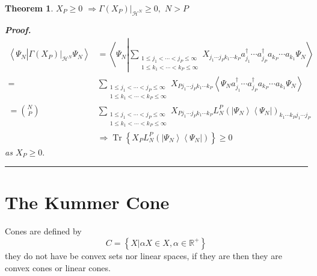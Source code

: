 \documentclass[aps,preprint]{revtex4}%
\newtheorem{theorem}{Theorem}
\newenvironment{proof}[1][Proof]{\noindent\textbf{#1.} }{\ \rule{0.5em}{0.5em}}
\begin{document}
\begin{theorem}
$X_{P}\geq0$ $\Rightarrow\left.  \Gamma\left(  X_{P}\right)  \right\vert
_{\mathcal{H}^{N}}\geq0,$ $N>P$

\begin{proof}%
\begin{align}
\left\langle \Psi_{N}\left\vert \left.  \Gamma\left(  X_{P}\right)
\right\vert _{\mathcal{H}^{N}}\right.  \Psi_{N}\right\rangle  &  =\left\langle
\Psi_{N}\left\vert \sum_{\substack{1\leq j_{1}<\cdots<j_{P}\leq\infty\\1\leq
k_{1}<\cdots<k_{P}\leq\infty}}X_{j_{1}\cdots j_{P}k_{1}\cdots k_{P}}a_{j_{1}%
}^{\dagger}\cdots a_{j_{P}}^{\dagger}a_{k_{P}}\cdots a_{k_{1}}\right.
\Psi_{N}\right\rangle \nonumber\\
=  &  \sum_{\substack{1\leq j_{1}<\cdots<j_{P}\leq\infty\\1\leq k_{1}%
<\cdots<k_{P}\leq\infty}}X_{Pj_{1}\cdots j_{P}k_{1}\cdots k_{P}}\left\langle
\Psi_{N}a_{j_{1}}^{\dagger}\cdots a_{j_{P}}^{\dagger}a_{k_{P}}\cdots a_{k_{1}%
}\Psi_{N}\right\rangle \nonumber\\
=\binom{N}{P}  &  \sum_{\substack{1\leq j_{1}<\cdots<j_{P}\leq\infty\\1\leq
k_{1}<\cdots<k_{P}\leq\infty}}X_{Pj_{1}\cdots j_{P}k_{1}\cdots k_{P}}L_{N}%
^{P}\left(  \left\vert \Psi_{N}\right\rangle \left\langle \Psi_{N}\right\vert
\right)  _{k_{1}\cdots k_{P}j_{1}\cdots j_{P}}\nonumber\\
&  \Rightarrow\operatorname{Tr}\left\{  X_{P}L_{N}^{P}\left(  \left\vert
\Psi_{N}\right\rangle \left\langle \Psi_{N}\right\vert \right)  \right\}
\geq0
\end{align}
as $X_{P}\geq0.$
\end{proof}
\end{theorem}

\section{The Kummer Cone}

Cones are defined by
\begin{equation}
C=\left\{  \left.  X\right\vert \alpha X\in X,\alpha\in\mathbb{R}^{+}\right\}
\end{equation}
they do not have be convex sets nor linear spaces, if they are then they are
convex cones or linear cones.
\end{document}
